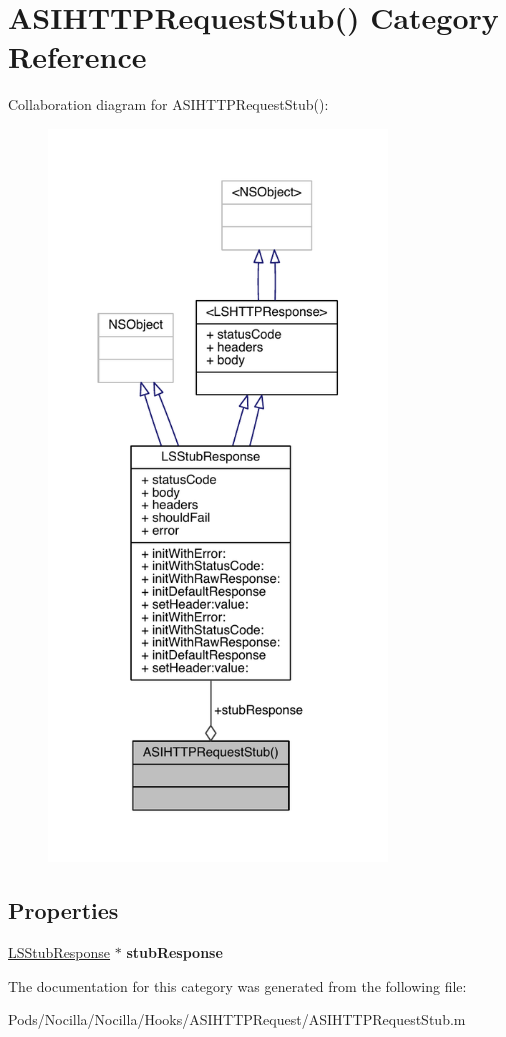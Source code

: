 \hypertarget{category_a_s_i_h_t_t_p_request_stub_07_08}{\section{A\-S\-I\-H\-T\-T\-P\-Request\-Stub() Category Reference}
\label{category_a_s_i_h_t_t_p_request_stub_07_08}
}


Collaboration diagram for A\-S\-I\-H\-T\-T\-P\-Request\-Stub()\-:\nopagebreak
\begin{figure}[H]
\begin{center}
\leavevmode
\includegraphics[height=550pt]{category_a_s_i_h_t_t_p_request_stub_07_08__coll__graph}
\end{center}
\end{figure}
\subsection*{Properties}
\begin{DoxyCompactItemize}
\item 
\hypertarget{category_a_s_i_h_t_t_p_request_stub_07_08_aa2244166a4e9c821a5a728194249ff45}{\hyperlink{interface_l_s_stub_response}{L\-S\-Stub\-Response} $\ast$ {\bfseries stub\-Response}}\label{category_a_s_i_h_t_t_p_request_stub_07_08_aa2244166a4e9c821a5a728194249ff45}

\end{DoxyCompactItemize}


The documentation for this category was generated from the following file\-:\begin{DoxyCompactItemize}
\item 
Pods/\-Nocilla/\-Nocilla/\-Hooks/\-A\-S\-I\-H\-T\-T\-P\-Request/A\-S\-I\-H\-T\-T\-P\-Request\-Stub.\-m\end{DoxyCompactItemize}
